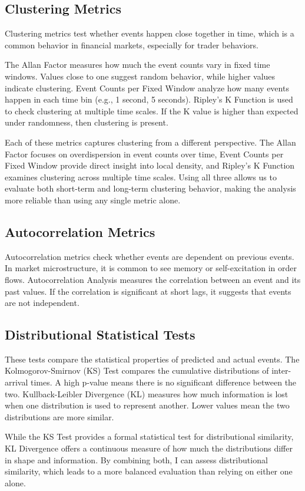 \subsection{Clustering Metrics}
Clustering metrics test whether events happen close together in time, which is a common behavior in financial markets, especially for trader behaviors.

The Allan Factor measures how much the event counts vary in fixed time windows. Values close to one suggest random behavior, while higher values indicate clustering. Event Counts per Fixed Window analyze how many events happen in each time bin (e.g., 1 second, 5 seconds). Ripley's K Function is used to check clustering at multiple time scales. If the K value is higher than expected under randomness, then clustering is present.

Each of these metrics captures clustering from a different perspective. The Allan Factor focuses on overdispersion in event counts over time, Event Counts per Fixed Window provide direct insight into local density, and Ripley's K Function examines clustering across multiple time scales. Using all three allows us to evaluate both short-term and long-term clustering behavior, making the analysis more reliable than using any single metric alone.

\subsection{Autocorrelation Metrics}
Autocorrelation metrics check whether events are dependent on previous events. In market microstructure, it is common to see memory or self-excitation in order flows. Autocorrelation Analysis measures the correlation between an event and its past values. If the correlation is significant at short lags, it suggests that events are not independent.

\subsection{Distributional Statistical Tests}
These tests compare the statistical properties of predicted and actual events. The Kolmogorov-Smirnov (KS) Test compares the cumulative distributions of inter-arrival times. A high p-value means there is no significant difference between the two. Kullback-Leibler Divergence (KL) measures how much information is lost when one distribution is used to represent another. Lower values mean the two distributions are more similar.

While the KS Test provides a formal statistical test for distributional similarity, KL Divergence offers a continuous measure of how much the distributions differ in shape and information. By combining both, I can assess distributional similarity, which leads to a more balanced evaluation than relying on either one alone.


